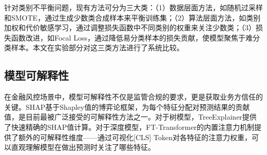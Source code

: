 针对类别不平衡问题，现有方法可分为三大类：（1）数据层面方法，如随机过采样和SMOTE\cite{chawla2002smote}，通过生成少数类合成样本来平衡训练集；（2）算法层面方法，如类别加权和代价敏感学习，通过调整损失函数中不同类别的权重来关注少数类；（3）损失函数改进，如Focal Loss\cite{lin2017focal}，通过降低易分类样本的损失贡献，使模型聚焦于难分类样本。本文在实验部分对这三类方法进行了系统比较。

\subsection{模型可解释性}

在金融风控场景中，模型可解释性不仅是监管合规的要求，更是获取业务方信任的关键。SHAP\cite{lundberg2017unified}基于Shapley值的博弈论框架，为每个特征分配对预测结果的贡献值，是目前最被广泛接受的可解释性方法之一。对于树模型，TreeExplainer提供了快速精确的SHAP值计算。对于深度模型，FT-Transformer的内置注意力机制提供了额外的可解释性维度——通过可视化[CLS] Token对各特征的注意力权重，可以直观理解模型在做出预测时关注了哪些特征。
